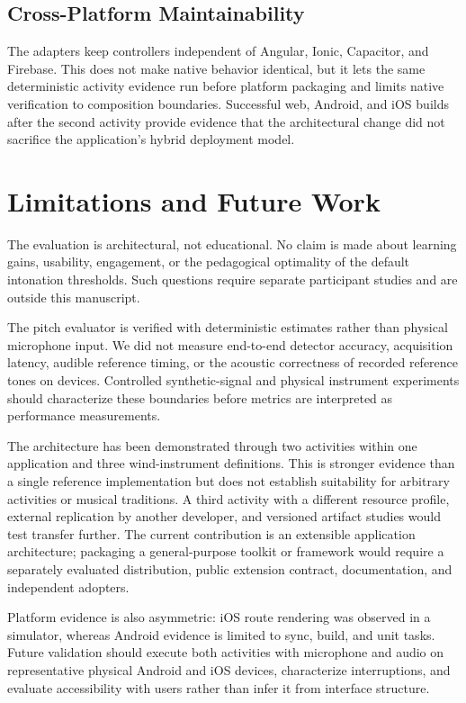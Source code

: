 \documentclass[runningheads]{llncs}
\begin{document}
\subsection{Cross-Platform Maintainability}

The adapters keep controllers independent of Angular, Ionic, Capacitor, and
Firebase. This does not make native behavior identical, but it lets the same
deterministic activity evidence run before platform packaging and limits
native verification to composition boundaries. Successful web, Android, and
iOS builds after the second activity provide evidence that the architectural
change did not sacrifice the application's hybrid deployment model.

\section{Limitations and Future Work}\label{sec:limitations}

The evaluation is architectural, not educational. No claim is made about
learning gains, usability, engagement, or the pedagogical optimality of the
default intonation thresholds. Such questions require separate participant
studies and are outside this manuscript.

The pitch evaluator is verified with deterministic estimates rather than
physical microphone input. We did not measure end-to-end detector accuracy,
acquisition latency, audible reference timing, or the acoustic correctness of
recorded reference tones on devices. Controlled synthetic-signal and physical
instrument experiments should characterize these boundaries before metrics
are interpreted as performance measurements.

The architecture has been demonstrated through two activities within one
application and three wind-instrument definitions. This is stronger evidence
than a single reference implementation but does not establish suitability for
arbitrary activities or musical traditions. A third activity with a different
resource profile, external replication by another developer, and versioned
artifact studies would test transfer further. The current contribution is an
extensible application architecture; packaging a general-purpose toolkit or
framework would require a separately evaluated distribution, public extension
contract, documentation, and independent adopters.

Platform evidence is also asymmetric: iOS route rendering was observed in a
simulator, whereas Android evidence is limited to sync, build, and unit tasks.
Future validation should execute both activities with microphone and audio on
representative physical Android and iOS devices, characterize interruptions,
and evaluate accessibility with users rather than infer it from interface
structure.
\end{document}
